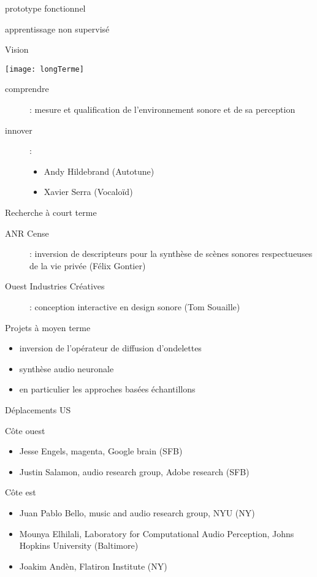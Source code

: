 prototype fonctionnel

apprentissage non supervisé

\begin{frame}{Vision}
\begin{center}
 \texttt{[image: longTerme]}
\end{center}
\begin{description}
\item[comprendre] : mesure et qualification de l'environnement sonore et de sa perception
\item[innover] : 
\begin{itemize}
\item Andy Hildebrand (Autotune)
\item Xavier Serra (Vocaloïd)
\end{itemize}
\end{description}
\end{frame}

\begin{frame}{Recherche à court terme}
\begin{description}
\item[ANR Cense]: inversion de descripteurs pour la synthèse de scènes sonores respectueuses de la vie privée (Félix Gontier)
\item[Ouest Industries Créatives]: conception interactive en design sonore (Tom Souaille)
\end{description}
\end{frame}

\begin{frame}{Projets à moyen terme}
\begin{itemize}
\item inversion de l'opérateur de diffusion d'ondelettes
\item synthèse audio neuronale
\item en particulier les approches basées échantillons
\end{itemize}
\end{frame}

\begin{frame}{Déplacements US}
\begin{block}{Côte ouest}
\begin{itemize}
\item Jesse Engels, magenta, Google brain (SFB)
\item Justin Salamon, audio research group, Adobe research (SFB)
\end{itemize}
\end{block}
\begin{block}{Côte est}
\begin{itemize}
\item Juan Pablo Bello, music and audio research group, NYU (NY) 
\item Mounya Elhilali, Laboratory for Computational Audio Perception, Johns Hopkins University (Baltimore)
\item Joakim Andèn, Flatiron Institute (NY)
\end{itemize}
\end{block}
\end{frame}

